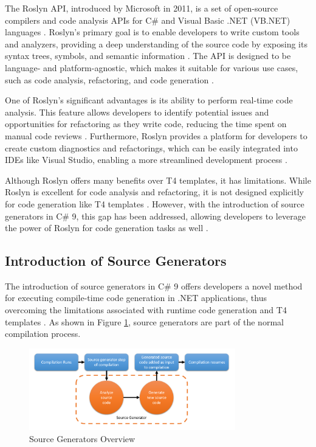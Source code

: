 The Roslyn API, introduced by Microsoft in 2011, is a set of open-source compilers and code analysis APIs for C\# and Visual Basic .NET (VB.NET) languages \cite{CSharpRoslyn}. Roslyn's primary goal is to enable developers to write custom tools and analyzers, providing a deep understanding of the source code by exposing its syntax trees, symbols, and semantic information \cite{Vermeir2022}. The API is designed to be language- and platform-agnostic, which makes it suitable for various use cases, such as code analysis, refactoring, and code generation \cite{Vermeir2022}.

One of Roslyn's significant advantages is its ability to perform real-time code analysis. This feature allows developers to identify potential issues and opportunities for refactoring as they write code, reducing the time spent on manual code reviews \cite{Vermeir2022}. Furthermore, Roslyn provides a platform for developers to create custom diagnostics and refactorings, which can be easily integrated into IDEs like Visual Studio, enabling a more streamlined development process \cite{CSharpRoslyn}.

Although Roslyn offers many benefits over T4 templates, it has limitations. While Roslyn is excellent for code analysis and refactoring, it is not designed explicitly for code generation like T4 templates \cite{Vermeir2022}. However, with the introduction of source generators in C\# 9, this gap has been addressed, allowing developers to leverage the power of Roslyn for code generation tasks as well \cite{Carter2020}.

\subsection{Introduction of Source Generators}

The introduction of source generators in C\# 9 offers developers a novel method for executing compile-time code generation in .NET applications, thus overcoming the limitations associated with runtime code generation and T4 templates \cite{Torgersen2020}. As shown in Figure \ref{fig:source_generators_workflow}, source generators are part of the normal compilation process.

\begin{figure}[H]
\centering
\includegraphics[width=0.8\textwidth]{graphics/source-generator-visualization.png}
\caption{Source Generators Overview}
\label{fig:source_generators_workflow}
\end{figure}

